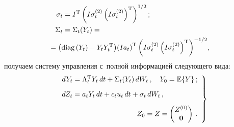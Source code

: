 \begin{multicols}{2}
\noindent
     \begin{align*}
          \sigma_t&= I^{\mathrm{T}}\left( I\sigma_t^{(2)} \left( 
I\sigma_t^{(2)}\right)^{\mathrm{T}}\right)^{1/2};\\
\Sigma_t&= \Sigma_t(Y_t) ={}\\
&\hspace*{-7mm} {}=
\left( \mathrm{diag}\left(Y_t\right) \hm-Y_tY_t^{\mathrm{T}}\right)\! \left(I a_t\right)^{\mathrm{T}} \left( 
I\sigma_t^{(2)}\left( I\sigma_t^{(2)}\right)^{\mathrm{T}}\right)^{-1/2}\!,
\end{align*}
 получаем систему 
управления с~полной информацией следующего вида:
     \begin{equation}
     \left.
     \begin{array}{l}
     dY_t=\Lambda_t^{\mathrm{T}} Y_t\,dt+\Sigma_t(Y_t)\,dW_t\,,\quad 
Y_0=\mathbb{E}\{Y\}\,;\\[9pt]
     dZ_t= a_tY_t \,dt+c_t u_t \,dt+ \sigma_t \,dW_t\,,\\[9pt] 
\hspace*{37mm}Z_0=Z=\begin{pmatrix}
     Z^{(0)}\\ \mathbf{0}
     \end{pmatrix}\,.
     \end{array}
     \right\}
     \label{e10-bos}
     \end{equation}
     

\end{multicols}
